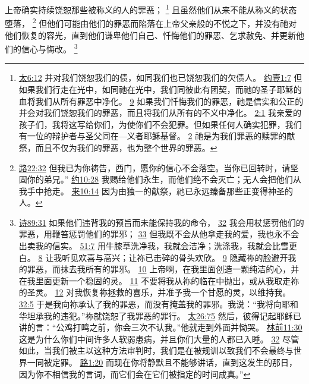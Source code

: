 \documentclass[12pt, a4paper, oneside]{ctexart}
\newcounter{parnum}[section]
\newcommand{\N}{%
   \noindent\refstepcounter{parnum}%
    \makebox[\parindent][l]{\textbf{\arabic{parnum}.}}}
\begin{document}
\N 上帝确实持续饶恕那些被称义的人的罪恶；
	\footnote {
		\href{https://biblehub.com/matthew/6-12.htm}{太6:12} 并对我们饶恕我们的债，如同我们也已饶恕我们的欠债人。
		\href{https://biblehub.com/1_john/1-7.htm}{约壹1:7} 但如果我们行走在光中，如同祂在光中，我们同彼此有团契，而祂的圣子耶稣的血将我们从所有罪恶中净化。
		\href{https://biblehub.com/1_john/1-9.htm}{9} 如果我们忏悔我们的罪恶，祂是信实和公正的并会对我们饶恕我们的罪恶，而且将我们从所有的不义中净化。
		\href{https://biblehub.com/1_john/2-1.htm}{2:1} 我亲爱的孩子们，我将这写给你们，为使你们不会犯罪。但如果任何人确实犯罪，我们有一位的辩护者与圣父同在---义者耶稣基督。
		\href{https://biblehub.com/1_john/2-2.htm}{2} 祂是为我们罪恶的赎罪的献祭，而且不仅为我们的罪恶，也为整个世界的罪恶。
	}
	且虽然他们从来不能从称义的状态堕落，
	\footnote {
		\href{https://biblehub.com/luke/22-32.htm}{路22:32} 但我已为你祷告，西门，愿你的信心不会落空。当你已回转时，请坚固你的弟兄。”
		\href{https://biblehub.com/john/10-28.htm}{约10:28} 我赐给他们永生，而他们绝不会灭亡；无人会把他们从我手中抢走。
		\href{https://biblehub.com/hebrews/10-14.htm}{来10:14} 因为由独一的献祭，祂已永远臻备那些正变得神圣的人。
	}
	但他们可能由他们的罪恶而陷落在上帝父亲般的不悦之下，并没有祂对他们恢复的容光，直到他们谦卑他们自己、忏悔他们的罪恶、乞求赦免、并更新他们的信心与悔改。
	\footnote {
		\href{https://biblehub.com/psalms/89-31.htm}{诗89:31} 如果他们违背我的预旨而未能保持我的命令，
		\href{https://biblehub.com/psalms/89-32.htm}{32} 我会用杖惩罚他们的罪恶，用鞭笞惩罚他们的罪邪；
		\href{https://biblehub.com/psalms/89-33.htm}{33} 但我既不会从他拿走我的爱，我也永不会出卖我的信实。
		\href{https://biblehub.com/psalms/51-7.htm}{51:7} 用牛膝草洗净我，我就会洁净；洗涤我，我就会比雪更白。
		\href{https://biblehub.com/psalms/51-8.htm}{8} 让我听见欢喜与高兴；让祢已击碎的骨头欢欣。
		\href{https://biblehub.com/psalms/51-9.htm}{9} 隐藏祢的脸避开我的罪恶，而抹去我所有的罪邪。
		\href{https://biblehub.com/psalms/51-10.htm}{10} 上帝啊，在我里面创造一颗纯洁的心，并在我里面更新一个稳固的灵。
		\href{https://biblehub.com/psalms/51-11.htm}{11} 不要将我从祢的临在中抛出，或从我取走祢的圣灵。
		\href{https://biblehub.com/psalms/51-12.htm}{12} 对我恢复祢拯救的喜乐，并准予我一个甘愿的灵，以维持我。
		\href{https://biblehub.com/psalms/32-5.htm}{32:5} 于是我向祢承认了我的罪恶，而没有掩盖我的罪邪。我说：“我将向耶和华坦承我的违犯。”祢就饶恕了我罪恶的罪行。
		\href{https://biblehub.com/matthew/26-75.htm}{太26:75} 然后，彼得记起耶稣已讲的言：“公鸡打鸣之前，你会三次不认我。”他就走到外面并恸哭。
		\href{https://biblehub.com/1_corinthians/11-30.htm}{林前11:30} 这是为什么你们中间许多人软弱患病，并且你们大量的人都已入睡。
		\href{https://biblehub.com/1_corinthians/11-32.htm}{32} 尽管如此，当我们被主以这种方法审判时，我们是在被规训以致我们不会最终与世界一同被定罪。
		\href{https://biblehub.com/luke/1-20.htm}{路1:20} 而现在你将静默且不能够讲话，直到这发生的那日，因为你不相信我的言词，而它们会在它们被指定的时间成真。”
	}
\end{document}
